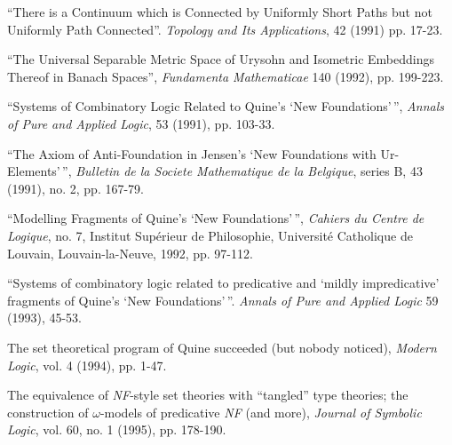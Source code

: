 \begin{description}

\newpage

        \item [List of Publications] \begin{description} \item
        \item[1.] ``There is a Continuum which is Connected by
        Uniformly Short Paths but not Uniformly Path Connected''.
        {\em Topology and Its Applications}, 42 (1991) pp. 17-23.
        \item[2.] ``The Universal Separable Metric Space of Urysohn
        and Isometric Embeddings Thereof in Banach Spaces'', {\em
        Fundamenta Mathematicae} 140 (1992), pp. 199-223.  \item[3.]
        ``Systems of Combinatory Logic Related to Quine's `New
        Foundations'\,'', {\em Annals of Pure and Applied Logic}, 53
        (1991), pp. 103-33.  \item[4.] ``The Axiom of Anti-Foundation
        in Jensen's `New Foundations with Ur-Elements'\,'', {\em
        Bulletin de la Societe Mathematique de la Belgique}, series B,
        43 (1991), no. 2, pp. 167-79.  \item[5.] ``Modelling Fragments
        of Quine's `New Foundations'\,'', {\em Cahiers du Centre de
        Logique}, no.  7, Institut Sup\'{e}rieur de Philosophie,
        Universit\'{e} Catholique de Louvain, Louvain-la-Neuve, 1992,
        pp. 97-112.

                \item[6.]  ``Systems of combinatory logic related to
predicative and `mildly impredicative' fragments of Quine's `New
Foundations'\,''.  {\em Annals of Pure and Applied Logic\/} 59 (1993),
45-53.
                \item[7.]  The set theoretical program of Quine
succeeded (but nobody noticed), {\em Modern Logic\/}, vol. 4 (1994),
pp. 1-47.
\item[8.] The equivalence of {\em NF\/}-style set theories with
``tangled'' type theories; the construction of $\omega$-models of
predicative {\em NF\/} (and more), {\em Journal of Symbolic Logic\/},
vol. 60, no. 1 (1995), pp. 178-190.


\end{description}
\end{description}
